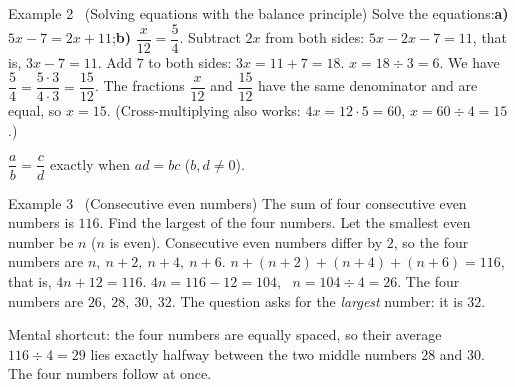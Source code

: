 \begin{exbox}{Example 2 \ (Solving equations with the balance principle)}
Solve the equations:\quad \textbf{a)} $5x-7=2x+11$;\qquad \textbf{b)} $\dfrac{x}{12}=\dfrac{5}{4}$.
\guide
{}
Subtract $2x$ from both sides: $5x-2x-7=11$, that is, $3x-7=11$.
Add $7$ to both sides: $3x=11+7=18$.
$x=18\div 3=6$.
We have $\dfrac{5}{4}=\dfrac{5\cdot 3}{4\cdot 3}=\dfrac{15}{12}$. The fractions $\dfrac{x}{12}$ and $\dfrac{15}{12}$ have the same denominator
and are equal, so $x=15$. (Cross-multiplying also works: $4x=12\cdot 5=60$, $x=60\div 4=15$.)
\begin{recallbox}$\dfrac{a}{b}=\dfrac{c}{d}$ exactly when $ad=bc$ ($b,d\neq 0$).\end{recallbox}
\end{exbox}

\begin{exbox}{Example 3 \ (Consecutive even numbers)}
The sum of four consecutive even numbers is $116$. Find the largest of the four numbers.
\guide
{}
Let the smallest even number be $n$ ($n$ is even). Consecutive even numbers differ by $2$, so the four numbers are
$n,\ n+2,\ n+4,\ n+6$.
$n+(n+2)+(n+4)+(n+6)=116$, that is, $4n+12=116$.
$4n=116-12=104$, \ $n=104\div 4=26$. The four numbers are $26,\ 28,\ 30,\ 32$.
The question asks for the \emph{largest} number: it is $32$.
\begin{tipbox}Mental shortcut: the four numbers are equally spaced, so their average $116\div 4=29$ lies exactly halfway between the two middle numbers $28$ and $30$. The four numbers follow at once.\end{tipbox}
\end{exbox}

